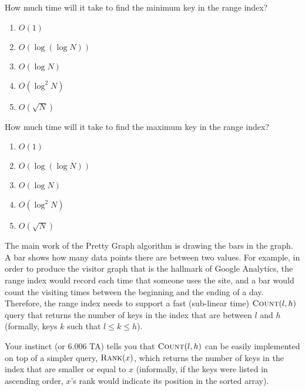 \documentclass[12pt,twoside]{article}
\begin{document}
\begin{problems}
\begin{problemparts}
\problempart {} How much time will it take to find the minimum key in
the range index?
\begin{enumerate}
  \item $O(1)$
  \item $O(\log(\log N))$
  \item $O(\log N)$
  \item $O(\log^2 N)$
  \item $O(\sqrt{N})$
\end{enumerate}

\problempart {} How much time will it take to find the maximum key in
the range index?
\begin{enumerate}
  \item $O(1)$
  \item $O(\log(\log N))$
  \item $O(\log N)$
  \item $O(\log^2 N)$
  \item $O(\sqrt{N})$
\end{enumerate}
\end{problemparts}

The main work of the Pretty Graph\texttrademark{} algorithm is drawing the bars
in the graph. A bar shows how many data points there are between two values. For
example, in order to produce the visitor graph that is the hallmark of Google
Analytics, the range index would record each time that someone uses the site,
and a bar would count the visiting times between the beginning and the ending of
a day. Therefore, the range index needs to support a fast (sub-linear time)
$\textnormal{\scshape Count}(l, h)$ query that returns the number of keys in the index
that are between $l$ and $h$ (formally, keys $k$ such that $l \le k \le h$).

Your instinct (or 6.006 TA) tells you that $\textnormal{\scshape Count}(l, h)$ can be easily
implemented on top of a simpler query, $\textnormal{\scshape Rank}(x)$, which returns the
number of keys in the index that are smaller or equal to $x$ (informally, if
the keys were listed in ascending order, $x$'s rank would indicate its position
in the sorted array).

\begin{problemparts}


\end{problemparts}
\end{problems}
\end{document}
